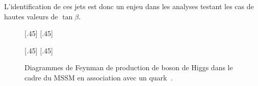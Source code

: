 L'identification de ces jets est donc un enjeu dans les analyses testant les cas de hautes valeurs de $\tan\beta$.
\begin{figure}[h]
\centering
\vspace{\baselineskip}
\subcaptionbox{\label{subfig-fgraph-Higgs_with_b_qq_g_bbh-MSSM}}[.45\textwidth]
{\vspace{\baselineskip}}
\hfill
\subcaptionbox{\label{subfig-fgraph-gg_hHAbb}}[.45\textwidth]
{\vspace{\baselineskip}}

\vspace{2\baselineskip}
\subcaptionbox{\label{subfig-fgraph-bb_hHA}}[.45\textwidth]
{\vspace{\baselineskip}}
\hfill
\subcaptionbox{\label{subfig-fgraph-bg_b_bhHA}}[.45\textwidth]
{\vspace{\baselineskip}}

\caption[Production de boson de Higgs du MSSM en association avec un quark~\quarkb.]{Diagrammes de Feynman de production de boson de Higgs dans le cadre du MSSM en association avec un quark~\quarkb.}
\label{fig-fgraph-Higgs_prod_with_b-MSSM}
\end{figure}
